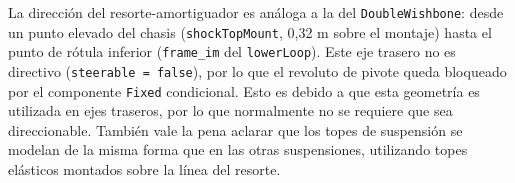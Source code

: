 


La dirección del resorte-amortiguador es análoga a la del \verb|DoubleWishbone|: desde un punto elevado del chasis (\verb|shockTopMount|, 0{,}32 m sobre el montaje) hasta el punto de rótula inferior (\verb|frame_im| del \verb|lowerLoop|). Este eje trasero no es directivo (\verb|steerable = false|), por lo que el revoluto de pivote queda bloqueado por el componente \verb|Fixed| condicional. Esto es debido a que esta geometría es utilizada en ejes traseros, por lo que normalmente no se requiere que sea direccionable. También vale la pena aclarar que los topes de suspensión se modelan de la misma forma que en las otras suspensiones, utilizando topes elásticos montados sobre la línea del resorte.\\



